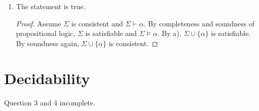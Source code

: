 \documentclass[12pt]{article}
\begin{document}
\begin{enumerate}
\begin{enumerate}
\begin{proof}
            \end{proof}
            \item The statement is true.
            \begin{proof}
                Assume $\Sigma$ is consistent and $\Sigma\vdash\alpha$. By completeness and soundness of propositional logic, $\Sigma$ is satisfiable and $\Sigma\models\alpha$. By a), $\Sigma\cup\{\alpha\}$ is satisfiable. By soundness again, $\Sigma\cup\{\alpha\}$ is consistent.
            \end{proof}
        \end{enumerate}
    \end{enumerate}

    \section{Decidability}
    Question 3 and 4 incomplete.
\end{document}
